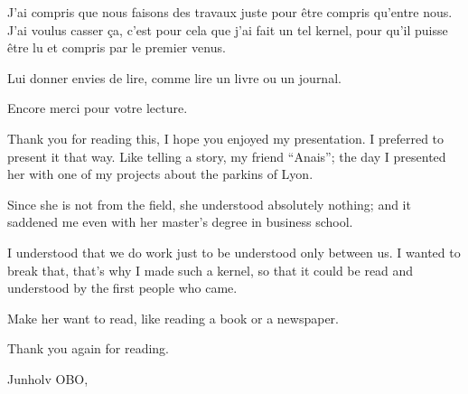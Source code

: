 \documentclass[11pt]{article}
\begin{document}
J'ai compris que nous faisons des travaux juste pour être compris
qu'entre nous. J'ai voulus casser ça, c'est pour cela que j'ai fait un
tel kernel, pour qu'il puisse être lu et compris par le premier venus.

Lui donner envies de lire, comme lire un livre ou un journal.

Encore merci pour votre lecture.

Thank you for reading this, I hope you enjoyed my presentation. I
preferred to present it that way. Like telling a story, my friend
``Anais''; the day I presented her with one of my projects about the
parkins of Lyon.

Since she is not from the field, she understood absolutely nothing; and
it saddened me even with her master's degree in business school.

I understood that we do work just to be understood only between us. I
wanted to break that, that's why I made such a kernel, so that it could
be read and understood by the first people who came.

Make her want to read, like reading a book or a newspaper.

Thank you again for reading.

Junholv OBO,


    
    
    
    
\end{document}
